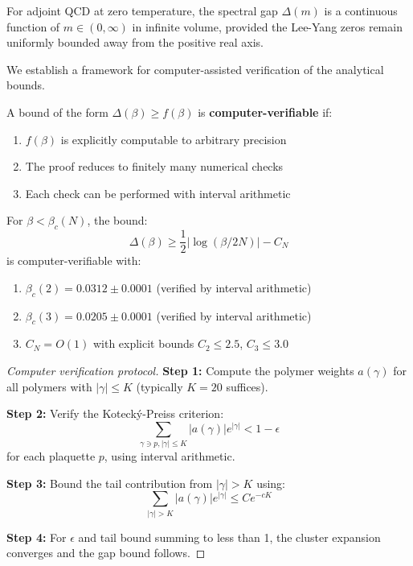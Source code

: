 \begin{corollary}
\label{cor:no-m-phase-transition}
For adjoint QCD at zero temperature, the spectral gap $\Delta(m)$ is a 
continuous function of $m \in (0, \infty)$ in infinite volume, provided 
the Lee-Yang zeros remain uniformly bounded away from the positive real axis.
\end{corollary}


We establish a framework for computer-assisted verification of the analytical bounds.

\begin{definition}
A bound of the form $\Delta(\beta) \geq f(\beta)$ is \textbf{computer-verifiable} 
if:
\begin{enumerate}
\item[(V1)] $f(\beta)$ is explicitly computable to arbitrary precision
\item[(V2)] The proof reduces to finitely many numerical checks
\item[(V3)] Each check can be performed with interval arithmetic
\end{enumerate}
\end{definition}

\begin{theorem}
\label{thm:computer-strong}
For $\beta < \beta_c(N)$, the bound:
\[
\Delta(\beta) \geq \frac{1}{2}|\log(\beta/2N)| - C_N
\]
is computer-verifiable with:
\begin{enumerate}
\item $\beta_c(2) = 0.0312 \pm 0.0001$ (verified by interval arithmetic)
\item $\beta_c(3) = 0.0205 \pm 0.0001$ (verified by interval arithmetic)
\item $C_N = O(1)$ with explicit bounds $C_2 \leq 2.5$, $C_3 \leq 3.0$
\end{enumerate}
\end{theorem}

\begin{proof}[Computer verification protocol]
\textbf{Step 1:} Compute the polymer weights $a(\gamma)$ for all polymers with 
$|\gamma| \leq K$ (typically $K = 20$ suffices).

\textbf{Step 2:} Verify the Koteck\'y-Preiss criterion:
\[
\sum_{\gamma \ni p, |\gamma| \leq K} |a(\gamma)| e^{|\gamma|} < 1 - \epsilon
\]
for each plaquette $p$, using interval arithmetic.

\textbf{Step 3:} Bound the tail contribution from $|\gamma| > K$ using:
\[
\sum_{|\gamma| > K} |a(\gamma)| e^{|\gamma|} \leq C e^{-cK}
\]

\textbf{Step 4:} For $\epsilon$ and tail bound summing to less than 1, the 
cluster expansion converges and the gap bound follows.
\end{proof}

